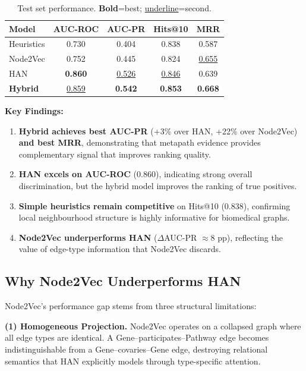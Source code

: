 \documentclass{article}
\begin{document}
\begin{table}[h]
\centering
\small
\caption{Test set performance. \textbf{Bold}=best; \underline{underline}=second.}
\label{tab:results}
\vspace{-0.5em}
\begin{tabular}{lcccc}
\toprule
\textbf{Model} & \textbf{AUC-ROC} & \textbf{AUC-PR} & \textbf{Hits@10} & \textbf{MRR} \\
\midrule
Heuristics     & 0.730 & 0.404 & 0.838 & 0.587 \\
Node2Vec       & 0.752 & 0.445 & 0.824 & \underline{0.655} \\
HAN            & \textbf{0.860} & \underline{0.526} & \underline{0.846} & 0.639 \\
\midrule
\textbf{Hybrid} & \underline{0.859} & \textbf{0.542} & \textbf{0.853} & \textbf{0.668} \\
\bottomrule
\end{tabular}
\end{table}

\textbf{Key Findings:}
\begin{enumerate}
\item \textbf{Hybrid achieves best AUC-PR} (+3\% over HAN, +22\% over Node2Vec) \textbf{and best MRR}, demonstrating that metapath evidence provides complementary signal that improves ranking quality.
\item \textbf{HAN excels on AUC-ROC} (0.860), indicating strong overall discrimination, but the hybrid model improves the ranking of true positives.
\item \textbf{Simple heuristics remain competitive} on Hits@10 (0.838), confirming local neighbourhood structure is highly informative for biomedical graphs.
\item \textbf{Node2Vec underperforms HAN} ($\Delta$AUC-PR $\approx$8 pp), reflecting the value of edge-type information that Node2Vec discards.
\end{enumerate}

\subsection{Why Node2Vec Underperforms HAN}

Node2Vec's performance gap stems from three structural limitations:

\textbf{(1) Homogeneous Projection.} Node2Vec operates on a collapsed graph where all edge types are identical. A Gene--participates--Pathway edge becomes indistinguishable from a Gene--covaries--Gene edge, destroying relational semantics that HAN explicitly models through type-specific attention.
\end{document}
